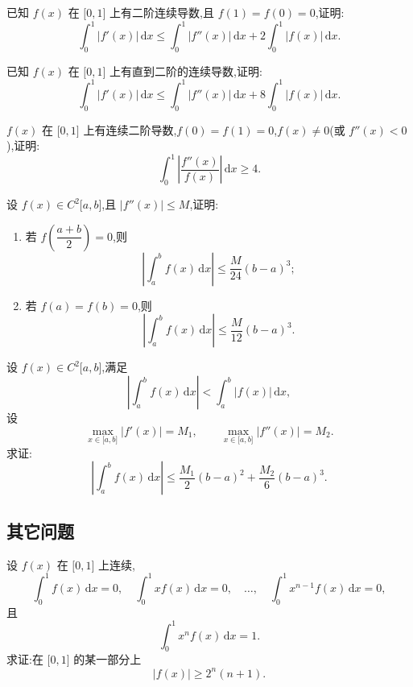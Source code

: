 \documentclass[../数学分析培优讲义.tex]{subfiles}
\begin{document}
\begin{example}
已知 $f(x)$ 在 $\lbrack 0,1\rbrack$ 上有二阶连续导数,且 $f(1)=f(0)=0$,证明:
\[
    \int_0^1|f'(x)|\,\mathrm{d}x
    \leq\int_0^1|f''(x)|\,\mathrm{d}x+2\int_0^1|f(x)|\,\mathrm{d}x.
\]
\end{example}
\exampleblank

\begin{example}
已知 $f(x)$ 在 $\lbrack 0,1\rbrack$ 上有直到二阶的连续导数,证明:
\[
    \int_0^1|f'(x)|\,\mathrm{d}x
    \leq\int_0^1|f''(x)|\,\mathrm{d}x+8\int_0^1|f(x)|\,\mathrm{d}x.
\]
\end{example}
\exampleblank

\begin{example}
$f(x)$ 在 $\lbrack 0,1\rbrack$ 上有连续二阶导数,$f(0)=f(1)=0$,$f(x)\neq0$(或 $f''(x)<0$),证明:
\[
    \int_0^1\left|\dfrac{f''(x)}{f(x)}\right|\,\mathrm{d}x\geq4.
\]
\end{example}
\exampleblank

\begin{example}
设 $f(x)\in C^2\lbrack a,b\rbrack$,且 $|f''(x)|\leq M$,证明:
\begin{enumerate}[label=(\arabic*)]
    \item 若 $f\left(\dfrac{a+b}{2}\right)=0$,则
    \[
        \left|\int_a^bf(x)\,\mathrm{d}x\right|
        \leq\dfrac{M}{24}(b-a)^3;
    \]
    \item 若 $f(a)=f(b)=0$,则
    \[
        \left|\int_a^bf(x)\,\mathrm{d}x\right|
        \leq\dfrac{M}{12}(b-a)^3.
    \]
\end{enumerate}
\end{example}
\exampleblank

\begin{example}
设 $f(x)\in C^2\lbrack a,b\rbrack$,满足
\[
    \left|\int_a^bf(x)\,\mathrm{d}x\right|
    <\int_a^b|f(x)|\,\mathrm{d}x,
\]
设
\[
    \max\limits_{x\in\lbrack a,b\rbrack}|f'(x)|=M_1,
    \qquad
    \max\limits_{x\in\lbrack a,b\rbrack}|f''(x)|=M_2.
\]
求证:
\[
    \left|\int_a^bf(x)\,\mathrm{d}x\right|
    \leq\dfrac{M_1}{2}(b-a)^2+\dfrac{M_2}{6}(b-a)^3.
\]
\end{example}
\exampleblank


\newpage

\subsection{其它问题}

\begin{example}
设 $f(x)$ 在 $\lbrack 0,1\rbrack$ 上连续,
\[
    \int_0^1f(x)\,\mathrm{d}x=0,
    \quad
    \int_0^1xf(x)\,\mathrm{d}x=0,
    \quad\ldots,\quad
    \int_0^1x^{n-1}f(x)\,\mathrm{d}x=0,
\]
且
\[
    \int_0^1x^n f(x)\,\mathrm{d}x=1.
\]
求证:在 $\lbrack 0,1\rbrack$ 的某一部分上
\[
    |f(x)|\geq2^n(n+1).
\]
\end{example}
\exampleblank
\end{document}
